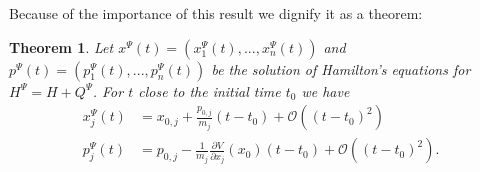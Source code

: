 \documentclass[12pt]{article}%
\newtheorem{theorem}{Theorem}
\begin{document}
Because of the importance of this result we dignify it as a theorem:

\begin{theorem}
\label{Thm1}Let $x^{\Psi}(t)=(x_{1}^{\Psi}(t),...,x_{n}^{\Psi}(t))$ and
$p^{\Psi}(t)=(p_{1}^{\Psi}(t),...,p_{n}^{\Psi}(t))$ be the solution of
Hamilton's equations for $H^{\Psi}=H+Q^{\Psi}$. For $t$ close to the initial
time $t_{0}$ we have
\begin{align}
x_{j}^{\Psi}(t)  &  =x_{0,j}+\frac{p_{0,j}}{m_{j}}(t-t_{0})+\mathcal{O}%
((t-t_{0})^{2})\label{good1}\\
p_{j}^{\Psi}(t)  &  =p_{0,j}-\frac{1}{m_{j}}\frac{\partial V}{\partial x_{j}%
}(x_{0})(t-t_{0})+\mathcal{O}((t-t_{0})^{2}). \label{good2}%
\end{align}

\end{theorem}
\end{document}
